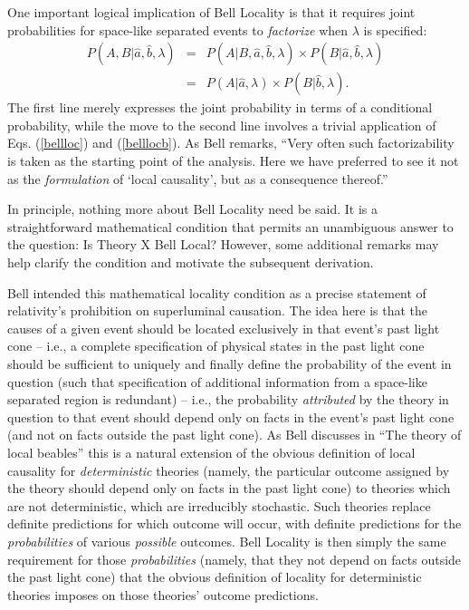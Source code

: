 \documentclass[aps,prc,onecolumn,12pt]{revtex4-2}
\begin{document}
One important logical implication of Bell Locality is that it requires
joint probabilities for space-like separated events to
\emph{factorize} when $\lambda$ is specified:
\begin{eqnarray}
P(A,B|\hat{a},\hat{b},\lambda) &=& P(A|B,\hat{a},\hat{b},\lambda)
\times P(B|\hat{a},\hat{b},\lambda) \nonumber \\
&=& P(A|\hat{a},\lambda) \times P(B|\hat{b},\lambda).
\label{factorize}
\end{eqnarray}
The first line merely expresses the joint probability in terms of a
conditional probability, while the move to the second line involves a
trivial application of Eqs. (\ref{bellloc}) and (\ref{belllocb}).
As Bell remarks, ``Very often
such factorizability is taken as the starting point of the analysis.
Here we have preferred to see it not as the \emph{formulation} of
`local causality', but as a consequence thereof.'' \cite[pg 243]{bell}

In principle, nothing more about Bell Locality need be said.  It is a
straightforward mathematical condition that permits an unambiguous
answer to the question:  Is Theory X Bell Local?  However, some
additional remarks may help clarify the condition and motivate the
subsequent derivation.

Bell intended this mathematical locality condition as a precise
statement of relativity's prohibition on superluminal causation.  The
idea here is that the causes of a given event should be located
exclusively in that event's past light cone -- i.e., a complete
specification of physical states in the past light cone should be
sufficient to uniquely and finally define the probability of the
event in question (such that specification of additional information
from a space-like separated region is redundant) -- i.e., the
probability \emph{attributed} by the theory in question to that event
should depend only on facts in the event's past light cone (and not on
facts outside the past light cone).  As Bell discusses in ``The theory
of local beables'' \cite[pg 52-62]{bell} this is a natural extension
of the obvious definition of local causality for \emph{deterministic}
theories (namely, the particular outcome assigned by the theory should
depend only on facts in the past light cone) to theories which are
not deterministic, which are irreducibly stochastic.  Such theories
replace definite predictions for which outcome will occur, with
definite predictions for the \emph{probabilities} of various
\emph{possible} outcomes.  Bell Locality is then simply the same
requirement for those \emph{probabilities} (namely, that they not depend on
facts outside the past light cone) that the obvious definition of
locality for deterministic theories imposes on those theories' outcome
predictions.
\end{document}
